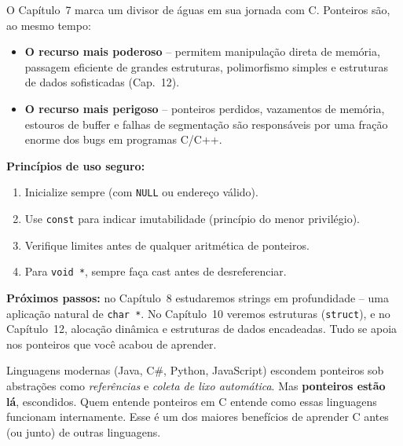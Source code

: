 \documentclass[12pt,a4paper]{article}
\begin{document}
\begin{tcolorbox}[colback=deitellightblue,colframe=deitelblue,
  title={\bfseries Ponteiros: o poder e a responsabilidade}]

O Capítulo~7 marca um divisor de águas em sua jornada com C. Ponteiros são, ao
mesmo tempo:

\begin{itemize}[noitemsep]
  \item \textbf{O recurso mais poderoso} -- permitem manipulação direta de memória,
  passagem eficiente de grandes estruturas, polimorfismo simples e estruturas
  de dados sofisticadas (Cap.~12).
  \item \textbf{O recurso mais perigoso} -- ponteiros perdidos, vazamentos de
  memória, estouros de buffer e falhas de segmentação são responsáveis por uma
  fração enorme dos bugs em programas C/C++.
\end{itemize}

\textbf{Princípios de uso seguro:}
\begin{enumerate}[noitemsep]
  \item Inicialize sempre (com \texttt{NULL} ou endereço válido).
  \item Use \texttt{const} para indicar imutabilidade (princípio do menor privilégio).
  \item Verifique limites antes de qualquer aritmética de ponteiros.
  \item Para \texttt{void *}, sempre faça cast antes de desreferenciar.
\end{enumerate}

\textbf{Próximos passos:} no Capítulo~8 estudaremos strings em profundidade --
uma aplicação natural de \texttt{char *}. No Capítulo~10 veremos estruturas
(\texttt{struct}), e no Capítulo~12, alocação dinâmica e estruturas de dados
encadeadas. Tudo se apoia nos ponteiros que você acabou de aprender.

\end{tcolorbox}

\begin{boaprática}
  Linguagens modernas (Java, C\#, Python, JavaScript) escondem ponteiros sob
  abstrações como \textit{referências} e \textit{coleta de lixo automática}.
  Mas \textbf{ponteiros estão lá}, escondidos. Quem entende ponteiros em C
  entende como essas linguagens funcionam internamente. Esse é um dos maiores
  benefícios de aprender C antes (ou junto) de outras linguagens.
\end{boaprática}
\end{document}
